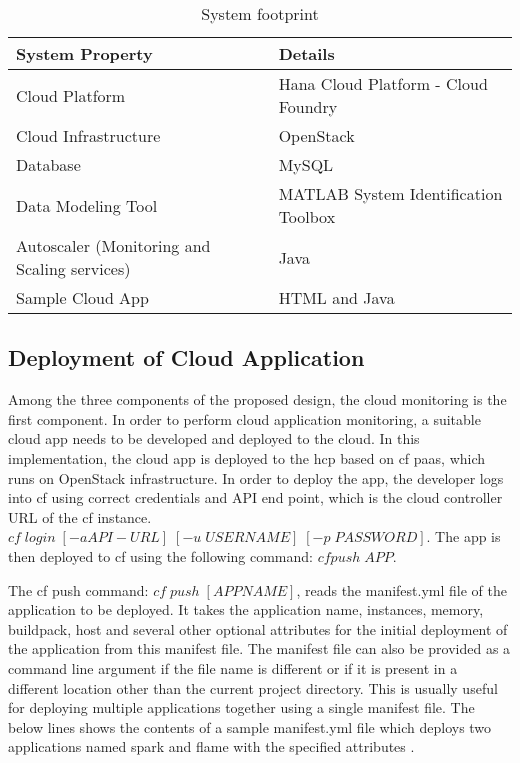 \documentclass[article,type=msc,colorback,12pt,accentcolor=tud8b,table]{tudthesis}
\begin{document}
\begin{table}[H]
	\centering
	\caption{System footprint}
	\label{tab:system_footprint}
	\begin{tabular}{|l|l|}
		\hline
		\rowcolor[HTML]{EC6500} 
		\textbf{System Property}  & \textbf{Details}                     \\ \hline
		Cloud Platform            & Hana Cloud Platform - Cloud Foundry  \\ \hline
		Cloud Infrastructure      & OpenStack                            \\ \hline
		Database                  & MySQL                                \\ \hline
		Data Modeling Tool        & MATLAB System Identification Toolbox \\ \hline
		Autoscaler (Monitoring and Scaling services) & Java                                 \\ \hline
		Sample Cloud App          & HTML and Java                        \\ \hline
	\end{tabular}
\end{table}

 
	\subsection{Deployment of Cloud Application} 

	Among the three components of the proposed design, the cloud monitoring is the first component. In order to perform cloud application monitoring, a suitable cloud app needs to be developed and deployed to the cloud. In this implementation, the cloud app is deployed to the \gls{hcp} based on \gls{cf} \gls{paas}, which runs on OpenStack \cite{openstack} infrastructure. In order to deploy the app, the developer logs into \gls{cf} using correct credentials and API end point, which is the cloud controller URL of the \gls{cf} instance. $ cf \; login \; [-a API-URL] \; [-u \; USERNAME] \; [-p \; PASSWORD] $. The app is then deployed to \gls{cf} using the following command: $ cf push \; APP $.		

The \gls{cf} push command:  $ cf \; push \; [APPNAME] $, reads the manifest.yml file of the application to be deployed. It takes the application name, instances, memory, buildpack, host and several other optional attributes for the initial deployment of the application from this manifest file. The manifest file can also be provided as a command line argument if the file name is different or if it is present in a different location other than the current project directory. This is usually useful for deploying multiple applications together using a single manifest file. The below lines shows the contents of a sample manifest.yml file which deploys two applications named spark and flame with the specified attributes \cite{cf_manifest}. 
\end{document}
